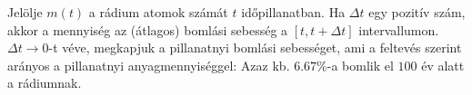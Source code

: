 Jelölje $m(t)$ a rádium atomok számát $t$ időpillanatban. Ha $\Delta t$ egy
pozitív szám, akkor a
mennyiség az (átlagos) bomlási sebesség a $[t,t+\Delta t]$ intervallumon.
$\Delta t\to 0$-t véve, megkapjuk a pillanatnyi bomlási sebességet, ami a feltevés
szerint arányos a pillanatnyi anyagmennyiséggel:
Azaz kb. $6.67$\%-a bomlik el $100$ év alatt a rádiumnak.
